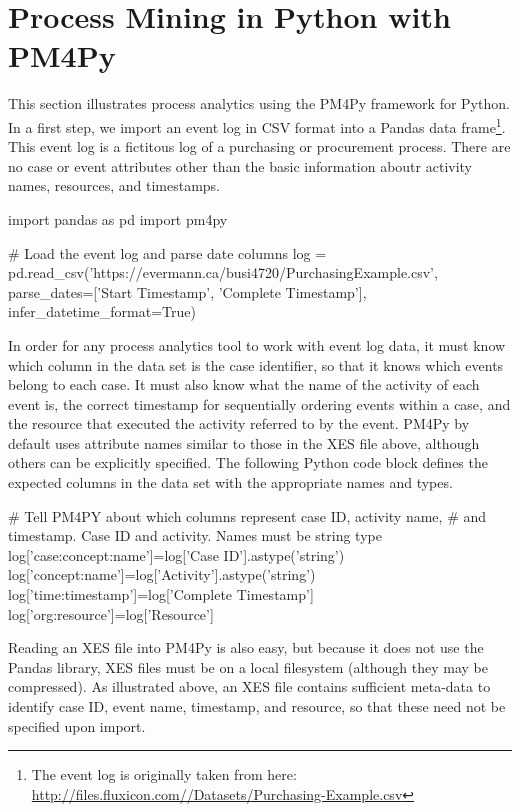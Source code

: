 \section{Process Mining in Python with PM4Py}

This section illustrates process analytics using the PM4Py framework for Python. In a first step, we import an event log in CSV format into a Pandas data frame\footnote{The event log is originally taken from here: \url{http://files.fluxicon.com//Datasets/Purchasing-Example.csv}}. This event log is a fictitous log of a purchasing or procurement process. There are no case or event attributes other than the basic information aboutr activity names, resources, and timestamps.

\begin{samepage}
\begin{pythoncode}
import pandas as pd
import pm4py

# Load the event log and parse date columns
log = pd.read_csv('https://evermann.ca/busi4720/PurchasingExample.csv', 
   parse_dates=['Start Timestamp', 'Complete Timestamp'], 
   infer_datetime_format=True)
\end{pythoncode}
\end{samepage}

In order for any process analytics tool to work with event log data, it must know which column in the data set is the case identifier, so that it knows which events belong to each case. It must also know what the name of the activity of each event is, the correct timestamp for sequentially ordering events within a case, and the resource that executed the activity referred to by the event. PM4Py by default uses attribute names similar to those in the XES file above, although others can be explicitly specified. The following Python code block defines the expected columns in the data set with the appropriate names and types.

\begin{samepage}
\begin{pythoncode}
# Tell PM4PY about which columns represent case ID, activity name, 
# and timestamp. Case ID and activity. Names must be string type
log['case:concept:name']=log['Case ID'].astype('string')
log['concept:name']=log['Activity'].astype('string')
log['time:timestamp']=log['Complete Timestamp']
log['org:resource']=log['Resource']
\end{pythoncode}
\end{samepage}

Reading an XES file into PM4Py is also easy, but because it does not use the Pandas library, XES files must be on a local filesystem (although they may be compressed). As illustrated above, an XES file contains sufficient meta-data to identify case ID, event name, timestamp, and resource, so that these need not be specified upon import.

